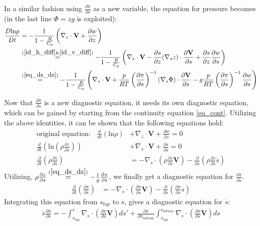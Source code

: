 In a similar fashion using $\frac{\partial \pi}{\partial s}$ as a new variable, the equation for pressure becomes (in the last line $\Phi = zg$ is exploited):
\begin{align*}
\frac{D\text{ln}p}{Dt} &= -\frac{1}{1- \frac{R}{C_p}} \left(\nabla_z \cdot \textbf{V} + \frac{\partial w}{\partial z}\right)\\
&\stackrel{(\ref{id_h_diff} \& \ref{id_v_diff})}{=} -\frac{1}{1- \frac{R}{C_p}} \left(\nabla _s \cdot \textbf{V} - \frac{\partial s}{\partial z} (\nabla _sz)\cdot \frac{\partial \textbf{V}}{\partial s} + \frac{\partial s}{\partial z}\frac{\partial w}{\partial s}\right)\\
&\stackrel{(\ref{eq_ds_dz})}{=} -\frac{1}{1- \frac{R}{C_p}} \left(\nabla _s \cdot \textbf{V} + \frac{p}{RT}\left(\frac{\partial \pi}{\partial s}\right)^{-1} (\nabla _s \Phi)\cdot\frac{\partial \textbf{V}}{\partial s} - g\frac{p}{RT}\left(\frac{\partial \pi}{\partial s}\right)^{-1} \frac{\partial w}{\partial s}\right)\\
\end{align*}

Now that $\frac{\partial \pi}{\partial s}$ is a new diagnostic equation, it needs its own diagnostic equation, which can be gained by starting from the continuity equation \ref{eq_cont}.
Utilizing the above identities, it can be shown that the following equations hold:
\begin{align*}
\text{original equation:}~~~~ \frac{d}{dt}\left(\text{ln}\rho\right) &+ \nabla _z \cdot \textbf{V} + \frac{\partial w}{\partial z} = 0 \\
\frac{d}{dt}\left(\text{ln}\left(\rho\frac{\partial z}{\partial s}\right)\right) &+ \nabla _s \cdot \textbf{V} + \frac{\partial \dot{s}}{\partial s} = 0\\
\frac{\partial}{\partial t}\left(\rho\frac{\partial z}{\partial s}\right) &= - \nabla _s \cdot \left(\rho\frac{\partial z}{\partial s}\textbf{V}\right) - \frac{\partial }{\partial s}\left(\rho\frac{\partial z}{\partial s}\dot{s}\right)
\end{align*}
Utilizing, $\rho\frac{\partial z}{\partial s} \stackrel{(\ref{eq_ds_dz})}{=} - \frac{1}{g}\frac{\partial \pi}{\partial s}$, we finally get a diagnostic equation for $\frac{\partial \pi}{\partial s}$.
\begin{align*}
\frac{\partial}{\partial t}\left(\frac{\partial \pi}{\partial s}\right) &= - \nabla _s \cdot \left(\frac{\partial \pi}{\partial s}\textbf{V}\right) - \frac{\partial }{\partial s}\left(\frac{\partial \pi}{\partial s}\dot{s}\right)
\end{align*}
Integrating this equation from $s_{top}$ to $s$, gives a diagnostic equation for $\dot{s}$:
\begin{align*}
\dot{s}\frac{\partial \pi}{\partial s} = -\int _{s_{top}}^s\nabla _s \cdot \left(\frac{\partial \pi}{\partial s}\textbf{V}\right)ds' + \frac{\partial \pi}{\partial \pi_{\text{bottom}}} \int  _{s_{top}}^{s_{bottom}} \nabla _s \cdot \left(\frac{\partial \pi}{\partial s}\textbf{V}\right) ds
\end{align*}


